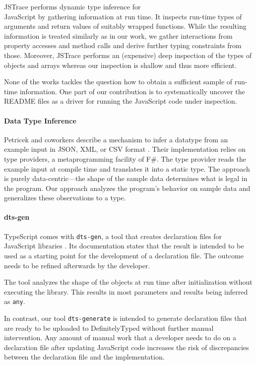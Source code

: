 \documentclass[sigplan,screen]{acmart}
\newcommand{\coderef}[1]{Listing~\ref{#1}}
\begin{document}
JSTrace \cite{saftoiu21:_jstrac} performs dynamic type inference
for \\ JavaScript by gathering information at run time. It inspects
run-time types of arguments and return values of suitably wrapped
functions. While the resulting information is treated similarly as in
our work, we gather interactions from property
accesses and method calls and derive further typing constraints from
those. Moreover, JSTrace performs an (expensive) deep inspection of
the types of objects and arrays whereas our inspection is shallow and
thus more efficient.

None of the works tackles the question how to obtain a sufficient
sample of run-time information. One part of our contribution is to
systematically uncover the README files as a driver for running the
JavaScript code under inspection.

\paragraph{Data Type Inference}
Petricek and coworkers describe a mechanism to infer a datatype from
an example input in JSON, XML, or CSV format
\cite{DBLP:conf/pldi/PetricekGS16}. Their implementation relies on
type providers, a metaprogramming facility of F\#. The type provider reads the
example input at compile time and translates it into a static
type. The approach is purely data-centric---the shape of the sample
data determines what is legal in the program. Our approach
analyzes the program's behavior on sample data and generalizes these
observations to a type.

\paragraph*{dts-gen}
TypeScript comes with \texttt{dts-gen}, a tool that creates declaration files for
JavaScript libraries \cite{dts-gen}. Its documentation states that the result is 
intended to be used as a starting point for the development of a declaration file. The outcome
needs to be refined afterwards by the developer. 

The tool analyzes the shape of the objects at run time after initialization without
executing the library. This results in most parameters and results being inferred as
\lstinline[language={}]{any}.

In contrast, our tool \texttt{dts-generate} is intended to generate declaration files
that are ready to be uploaded to DefinitelyTyped without further manual intervention. Any
amount of manual work that a developer needs to do on a declaration file after updating
JavaScript code increases the risk of discrepancies between the declaration file
and the implementation.
\end{document}
